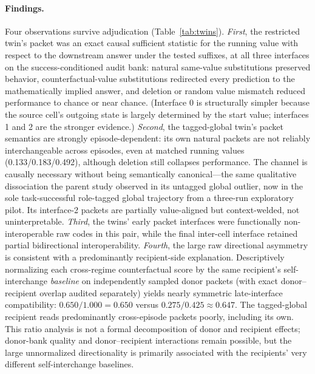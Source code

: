 \documentclass[11pt]{article}
\begin{document}
\paragraph{Findings.} Four observations survive adjudication (Table~\ref{tab:twins}). \emph{First}, the restricted twin's packet was an exact causal sufficient statistic for the running value with respect to the downstream answer under the tested suffixes, at all three interfaces on the success-conditioned audit bank: natural same-value substitutions preserved behavior, counterfactual-value substitutions redirected every prediction to the mathematically implied answer, and deletion or random value mismatch reduced performance to chance or near chance. (Interface 0 is structurally simpler because the source cell's outgoing state is largely determined by the start value; interfaces 1 and 2 are the stronger evidence.) \emph{Second}, the tagged-global twin's packet semantics are strongly episode-dependent: its own natural packets are not reliably interchangeable across episodes, even at matched running values (0.133/0.183/0.492), although deletion still collapses performance. The channel is causally necessary without being semantically canonical---the same qualitative dissociation the parent study observed in its untagged global outlier, now in the sole task-successful role-tagged global trajectory from a three-run exploratory pilot. Its interface-2 packets are partially value-aligned but context-welded, not uninterpretable. \emph{Third}, the twins' early packet interfaces were functionally non-interoperable raw codes in this pair, while the final inter-cell interface retained partial bidirectional interoperability. \emph{Fourth}, the large raw directional asymmetry is consistent with a predominantly recipient-side explanation. Descriptively normalizing each cross-regime counterfactual score by the same recipient's self-interchange \emph{baseline} on independently sampled donor packets (with exact donor--recipient overlap audited separately) yields nearly symmetric late-interface compatibility: $0.650/1.000=0.650$ versus $0.275/0.425\approx0.647$. The tagged-global recipient reads predominantly cross-episode packets poorly, including its own. This ratio analysis is not a formal decomposition of donor and recipient effects; donor-bank quality and donor--recipient interactions remain possible, but the large unnormalized directionality is primarily associated with the recipients' very different self-interchange baselines.
\end{document}

